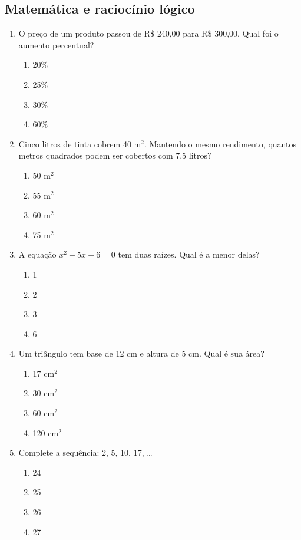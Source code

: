 \documentclass[12pt,a4paper]{article}
\begin{document}
\subsection*{Matemática e raciocínio lógico}
\begin{enumerate}[resume]
  \item O preço de um produto passou de R\$ 240,00 para R\$ 300,00. Qual foi o aumento percentual?
  \begin{enumerate}[label=\alph*)]
    \item 20\%
    \item 25\%
    \item 30\%
    \item 60\%
  \end{enumerate}

  \item Cinco litros de tinta cobrem 40 m$^2$. Mantendo o mesmo rendimento, quantos metros quadrados podem ser cobertos com 7,5 litros?
  \begin{enumerate}[label=\alph*)]
    \item 50 m$^2$
    \item 55 m$^2$
    \item 60 m$^2$
    \item 75 m$^2$
  \end{enumerate}

  \item A equação $x^2-5x+6=0$ tem duas raízes. Qual é a menor delas?
  \begin{enumerate}[label=\alph*)]
    \item 1
    \item 2
    \item 3
    \item 6
  \end{enumerate}

  \item Um triângulo tem base de 12 cm e altura de 5 cm. Qual é sua área?
  \begin{enumerate}[label=\alph*)]
    \item 17 cm$^2$
    \item 30 cm$^2$
    \item 60 cm$^2$
    \item 120 cm$^2$
  \end{enumerate}

  \item Complete a sequência: 2, 5, 10, 17, \ldots
  \begin{enumerate}[label=\alph*)]
    \item 24
    \item 25
    \item 26
    \item 27
  \end{enumerate}
\end{enumerate}
\end{document}
